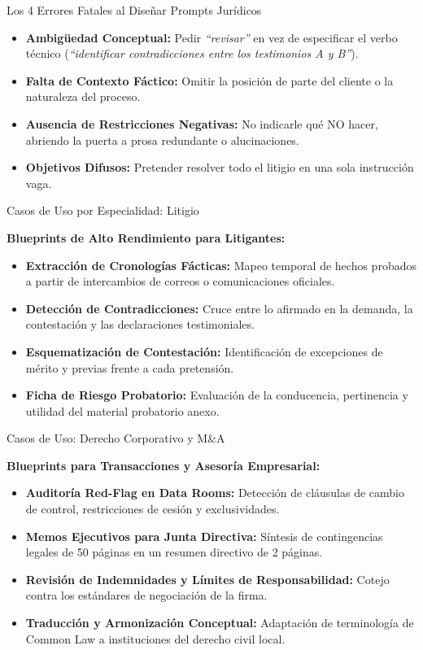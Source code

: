 \documentclass[aspectratio=169]{beamer}
\begin{document}
\begin{frame}{Los 4 Errores Fatales al Diseñar Prompts Jurídicos}

\begin{itemize}
  \item \textbf{Ambigüedad Conceptual:} Pedir \textit{``revisar''} en vez de especificar el verbo técnico (\textit{``identificar contradicciones entre los testimonios A y B''}).
  \item \textbf{Falta de Contexto Fáctico:} Omitir la posición de parte del cliente o la naturaleza del proceso.
  \item \textbf{Ausencia de Restricciones Negativas:} No indicarle qué NO hacer, abriendo la puerta a prosa redundante o alucinaciones.
  \item \textbf{Objetivos Difusos:} Pretender resolver todo el litigio en una sola instrucción vaga.
\end{itemize}
\end{frame}

\begin{frame}{Casos de Uso por Especialidad: Litigio}

\textbf{Blueprints de Alto Rendimiento para Litigantes:}
\begin{itemize}
  \item \textbf{Extracción de Cronologías Fácticas:} Mapeo temporal de hechos probados a partir de intercambios de correos o comunicaciones oficiales.
  \item \textbf{Detección de Contradicciones:} Cruce entre lo afirmado en la demanda, la contestación y las declaraciones testimoniales.
  \item \textbf{Esquematización de Contestación:} Identificación de excepciones de mérito y previas frente a cada pretensión.
  \item \textbf{Ficha de Riesgo Probatorio:} Evaluación de la conducencia, pertinencia y utilidad del material probatorio anexo.
\end{itemize}
\end{frame}

\begin{frame}{Casos de Uso: Derecho Corporativo y M\&A}

\textbf{Blueprints para Transacciones y Asesoría Empresarial:}
\begin{itemize}
  \item \textbf{Auditoría Red-Flag en Data Rooms:} Detección de cláusulas de cambio de control, restricciones de cesión y exclusividades.
  \item \textbf{Memos Ejecutivos para Junta Directiva:} Síntesis de contingencias legales de 50 páginas en un resumen directivo de 2 páginas.
  \item \textbf{Revisión de Indemnidades y Límites de Responsabilidad:} Cotejo contra los estándares de negociación de la firma.
  \item \textbf{Traducción y Armonización Conceptual:} Adaptación de terminología de Common Law a instituciones del derecho civil local.
\end{itemize}
\end{frame}
\end{document}
